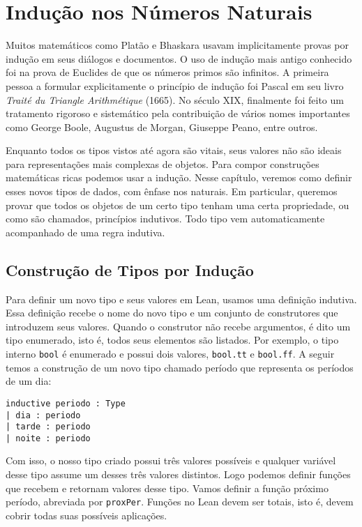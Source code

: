 \chapter{Indução nos Números Naturais}

Muitos matemáticos como Platão e Bhaskara usavam implicitamente provas por indução em seus diálogos e documentos. O uso de indução mais antigo conhecido foi na prova de Euclides de que os números primos são infinitos. A primeira pessoa a formular explicitamente o princípio de indução foi Pascal em seu livro \textit{Traité du Triangle Arithmétique} (1665). No século XIX, finalmente foi feito um tratamento rigoroso e sistemático pela contribuição de vários nomes importantes como George Boole, Augustus de Morgan, Giuseppe Peano, entre outros.

Enquanto todos os tipos vistos até agora são vitais, seus valores não são ideais para representações mais complexas de objetos. Para compor construções matemáticas ricas podemos usar a indução. Nesse capítulo, veremos como definir esses novos tipos de dados, com ênfase nos naturais. Em particular, queremos provar que todos os objetos de um certo tipo tenham uma certa propriedade, ou como são chamados, princípios indutivos. Todo tipo vem automaticamente acompanhado de uma regra indutiva.

\section{Construção de Tipos por Indução}

Para definir um novo tipo e seus valores em Lean, usamos uma definição indutiva. Essa definição recebe o nome do novo tipo e um conjunto de construtores que introduzem seus valores. Quando o construtor não recebe argumentos, é dito um tipo enumerado, isto é, todos seus elementos são listados. Por exemplo, o tipo interno \lstinline{bool} é enumerado e possui dois valores, \lstinline{bool.tt} e \lstinline{bool.ff}. A seguir temos a construção de um novo tipo chamado período que representa os períodos de um dia:

\begin{lstlisting}
inductive periodo : Type
| dia : periodo
| tarde : periodo
| noite : periodo
\end{lstlisting}

Com isso, o nosso tipo criado possui três valores possíveis e qualquer variável desse tipo assume um desses três valores distintos. Logo podemos definir funções que recebem e retornam valores desse tipo. Vamos definir a função próximo período, abreviada por \lstinline{proxPer}. Funções no Lean devem ser totais, isto é, devem cobrir todas suas possíveis aplicações.

